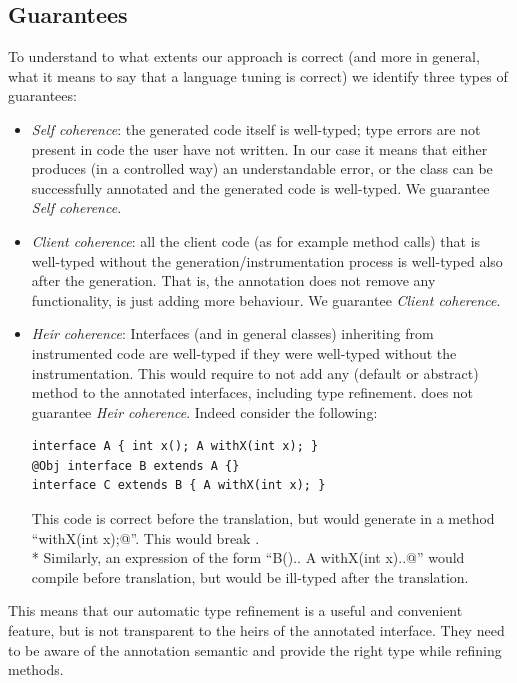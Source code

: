 


\subsection{Guarantees}
To understand to what extents our approach is correct (and more in general, what it means to say that a language tuning is correct) we identify three types of guarantees:

\begin{itemize}
\item \textit{Self coherence}: the generated code itself is well-typed; type errors are not present in code the user have not written.
In our case it means that either \mixin{} produces (in a controlled way) an understandable error, or the class can be successfully annotated and the generated code is well-typed.
We guarantee \textit{Self coherence}.

\item \textit{Client coherence}: all the client code (as for example method calls) that is well-typed without the generation/instrumentation process is well-typed also after the generation.
That is, the annotation does not remove any functionality, is just
adding more behaviour.
We guarantee \textit{Client coherence}.

\item \textit{Heir coherence}: Interfaces (and in general classes) inheriting from instrumented code are well-typed if they were well-typed without the instrumentation.
This would require to not add any (default or abstract) method to the annotated interfaces, including type refinement.
\mixin  does not guarantee \textit{Heir coherence}.
Indeed consider the following:

\begin{lstlisting}
interface A { int x(); A withX(int x); }
@Obj interface B extends A {}
interface C extends B { A withX(int x); }
\end{lstlisting}

\noindent This code is correct before the translation, but \mixin would  generate in \Q@B@  a method ``\Q@B withX(int x);@''.
This would break \Q@C@. \\*
Similarly, an expression of the form ``\Q@new B(){.. A withX(int x){..}}@'' would compile before translation, but would be ill-typed after the translation.
\end{itemize}

\noindent This means that our automatic type refinement 
is a useful and convenient feature, but is not transparent to the heirs of the annotated interface. They need to be aware of the annotation semantic  and provide the right type while refining methods.

